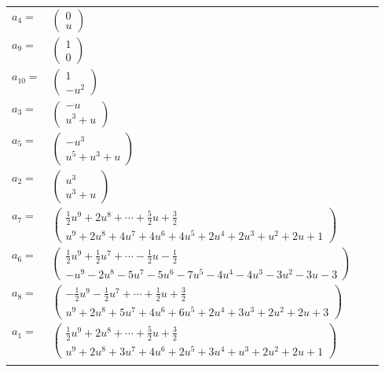 \documentclass[1p]{elsarticle_modified}
\theoremstyle{definition}
\begin{document}
\begin{tabular}{m{7pt} m{180pt} m{7pt} m{180pt} }
\flushright $a_{4}=$&$\begin{pmatrix}0\\u\end{pmatrix}$ \\
\flushright $a_{9}=$&$\begin{pmatrix}1\\0\end{pmatrix}$ \\
\flushright $a_{10}=$&$\begin{pmatrix}1\\- u^2\end{pmatrix}$ \\
\flushright $a_{3}=$&$\begin{pmatrix}- u\\u^3+u\end{pmatrix}$ \\
\flushright $a_{5}=$&$\begin{pmatrix}- u^3\\u^5+u^3+u\end{pmatrix}$ \\
\flushright $a_{2}=$&$\begin{pmatrix}u^3\\u^3+u\end{pmatrix}$ \\
\flushright $a_{7}=$&$\begin{pmatrix}\frac{1}{2} u^9+2 u^8+\cdots+\frac{5}{2} u+\frac{3}{2}\\u^9+2 u^8+4 u^7+4 u^6+4 u^5+2 u^4+2 u^3+u^2+2 u+1\end{pmatrix}$ \\
\flushright $a_{6}=$&$\begin{pmatrix}\frac{1}{2} u^9+\frac{1}{2} u^7+\cdots-\frac{1}{2} u-\frac{1}{2}\\- u^9-2 u^8-5 u^7-5 u^6-7 u^5-4 u^4-4 u^3-3 u^2-3 u-3\end{pmatrix}$ \\
\flushright $a_{8}=$&$\begin{pmatrix}-\frac{1}{2} u^9-\frac{1}{2} u^7+\cdots+\frac{1}{2} u+\frac{3}{2}\\u^9+2 u^8+5 u^7+4 u^6+6 u^5+2 u^4+3 u^3+2 u^2+2 u+3\end{pmatrix}$ \\
\flushright $a_{1}=$&$\begin{pmatrix}\frac{1}{2} u^9+2 u^8+\cdots+\frac{5}{2} u+\frac{3}{2}\\u^9+2 u^8+3 u^7+4 u^6+2 u^5+3 u^4+u^3+2 u^2+2 u+1\end{pmatrix}$\\&\end{tabular}
\end{document}
